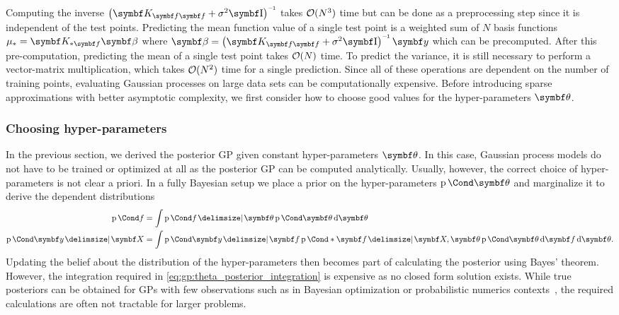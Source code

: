 Computing the inverse $\left(\mat{K}_{\mat{f}\mat{f}} + \sigma^2 \Eye \right)\inv$ takes $\operatorname{\mathcal{O}}(N^3)$ time but can be done as a preprocessing step since it is independent of the test points.
Predicting the mean function value of a single test point is a weighted sum of $N$ basis functions $\mu_\ast = \mat{K_{\ast \mat{f}}} \mat{\beta}$ where $\mat{\beta} = \left(\mat{K}_{\mat{f}\mat{f}} + \sigma^2 \Eye \right)\inv \mat{y}$ which can be precomputed.
After this pre-computation, predicting the mean of a single test point takes $\operatorname{\mathcal{O}}(N)$ time.
To predict the variance, it is still necessary to perform a vector-matrix multiplication, which takes $\operatorname{\mathcal{O}}(N^2)$ time for a single prediction.
Since all of these operations are dependent on the number of training points, evaluating Gaussian processes on large data sets can be computationally expensive.
Before introducing sparse approximations with better asymptotic complexity, we first consider how to choose good values for the hyper-parameters $\mat{\theta}$.

\subsubsection{Choosing hyper-parameters}
In the previous section, we derived the posterior GP given constant hyper-parameters $\mat{\theta}$.
In this case, Gaussian process models do not have to be trained or optimized at all as the posterior GP can be computed analytically.
Usually, however, the correct choice of hyper-parameters is not clear a priori.
In a fully Bayesian setup we place a prior on the hyper-parameters $\Prob{\mat{\theta}}$ and marginalize it to derive the dependent distributions
\begin{equation}
    \begin{split}
        \label{eq:gp:theta_posterior_integration}
        \Prob{f}
        & = \int \Prob{f \given \mat{\theta}} \Prob{\mat{\theta}} \diff \mat{\theta}                                                           \\
        \Prob{\mat{y} \given \mat{X}}
        & = \int \Prob{\mat{y} \given \mat{f}} \Prob*{\mat{f} \given \mat{X}, \mat{\theta}} \Prob{\mat{\theta}} \diff \mat{f} \diff \mat{\theta}.
    \end{split}
\end{equation}
Updating the belief about the distribution of the hyper-parameters then becomes part of calculating the posterior using Bayes' theorem.
However, the integration required in \cref{eq:gp:theta_posterior_integration} is expensive as no closed form solution exists.
While true posteriors can be obtained for GPs with few observations such as in Bayesian optimization or probabilistic numerics contexts~\parencite{shahriari_taking_2016,oates_modern_2019}, the required calculations are often not tractable for larger problems.

